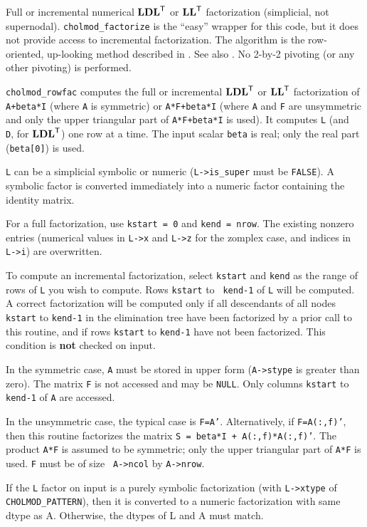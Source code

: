 \documentclass[11pt]{article}
\newcommand{\m}[1]{{\bf{#1}}}       %
\newcommand{\tr}{^{\sf T}}          %
\begin{document}

Full or incremental numerical $\m{LDL}\tr$ or $\m{LL}\tr$ factorization
(simplicial, not supernodal).  {\tt cholmod\_factorize} is the ``easy'' wrapper
for this code, but it does not provide access to incremental factorization.
The algorithm is the row-oriented, up-looking method described in
\cite{Davis05}.  See also \cite{Liu86c}.  No 2-by-2 pivoting (or any other
pivoting) is performed.

{\tt cholmod\_rowfac} computes the full or incremental $\m{LDL}\tr$ or
$\m{LL}\tr$ factorization of {\tt A+beta*I} (where {\tt A} is symmetric) or
{\tt A*F+beta*I} (where {\tt A} and {\tt F} are unsymmetric and only the upper
triangular part of {\tt A*F+beta*I} is used).  It computes {\tt L} (and {\tt
D}, for $\m{LDL}\tr$) one row at a time.  The input scalar {\tt beta} is real;
only the real part ({\tt beta[0]}) is used.

{\tt L} can be a simplicial symbolic or numeric ({\tt L->is\_super} must be
{\tt FALSE}).  A symbolic factor is converted immediately into a numeric factor
containing the identity matrix.

For a full factorization, use {\tt kstart = 0} and {\tt kend = nrow}.  The
existing nonzero entries (numerical values in {\tt L->x} and {\tt L->z} for the
zomplex case, and indices in {\tt L->i}) are overwritten.

To compute an incremental factorization, select {\tt kstart} and {\tt kend} as
the range of rows of {\tt L} you wish to compute.    Rows {\tt kstart} to {\tt
kend-1} of {\tt L} will be computed.  A correct factorization will be computed
only if all descendants of all nodes {\tt kstart} to {\tt kend-1} in the
elimination tree have been factorized by a prior call to this routine, and if
rows {\tt kstart} to {\tt kend-1} have not been factorized.  This condition is
{\bf not} checked on input.

In the symmetric case, {\tt A} must be stored in upper form ({\tt A->stype} is
greater than zero).  The matrix {\tt F} is not accessed and may be {\tt NULL}.
Only columns {\tt kstart} to {\tt kend-1} of {\tt A} are accessed.

In the unsymmetric case, the typical case is {\tt F=A'}.  Alternatively, if
{\tt F=A(:,f)'}, then this routine factorizes the matrix {\tt S = beta*I +
A(:,f)*A(:,f)'}.  The product {\tt A*F} is assumed to be symmetric; only the
upper triangular part of {\tt A*F} is used.  {\tt F} must be of size {\tt
A->ncol} by {\tt A->nrow}.

If the \verb'L' factor on input is a purely symbolic factorization (with
\verb'L->xtype' of \verb'CHOLMOD_PATTERN'), then it is converted to a numeric
factorization with same dtype as A.  Otherwise, the dtypes of L and A must
match.
\end{document}
